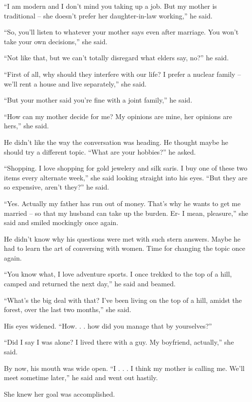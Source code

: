“I am modern and I don't mind you taking up a job. But my mother is traditional
– she doesn't prefer her daughter-in-law working,” he said.

“So, you'll listen to whatever your mother says even after marriage. You won't
take your own decisions,” she said.

“Not like that, but we can't totally disregard what elders say, no?” he said.

“First of all, why should they interfere with our life? I prefer a nuclear
family – we'll rent a house and live separately,” she said.

“But your mother said you're fine with a joint family,” he said.

“How can my mother decide for me? My opinions are mine, her opinions are hers,”
she said.

He didn't like the way the conversation was heading. He thought maybe he should
try a different topic. “What are your hobbies?” he asked.

“Shopping. I love shopping for gold jewelery and silk saris. I buy one of these
two items every alternate week,” she said looking straight into his eyes.
“But they are so expensive, aren't they?” he said.

“Yes. Actually my father has run out of money. That's why he wants to get me
married – so that my husband can take up the burden. Er- I mean, pleasure,” she
said and smiled mockingly once again.

He didn't know why his questions were met with such stern answers. Maybe he had
to learn the art of conversing with women. Time for changing the topic once
again.

“You know what, I love adventure sports. I once trekked to the top of a hill,
camped and returned the next day,” he said and beamed.

“What's the big deal with that? I've been living on the top of a hill, amidst
the forest, over the last two months,” she said.

His eyes widened. “How. . . how did you manage that by yourselves?”

“Did I say I was alone? I lived there with a guy. My boyfriend, actually,” she
said.

By now, his mouth was wide open. “I . . . I think my mother is calling me. We'll
meet sometime later,” he said and went out hastily.

She knew her goal was accomplished.

